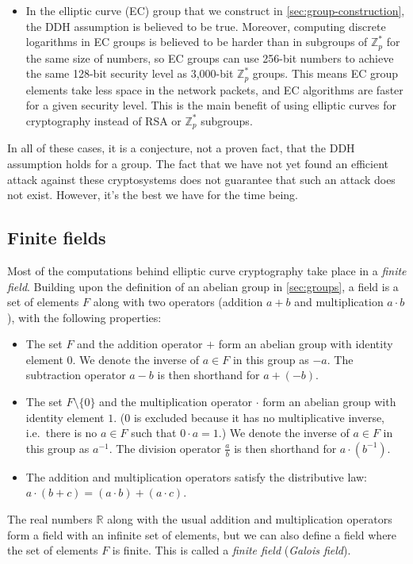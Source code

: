 \documentclass[manuscript]{acmart}
\begin{document}
\begin{itemize}
\item In the elliptic curve (EC) group that we construct in \autoref{sec:group-construction}, the DDH assumption is believed to be true.
    Moreover, computing discrete logarithms in EC groups is believed to be harder than in subgroups of $\mathbb{Z}_p^*$ for the same size of numbers, so EC groups can use 256-bit numbers to achieve the same 128-bit security level as 3,000-bit $\mathbb{Z}_p^*$ groups.
    This means EC group elements take less space in the network packets, and EC algorithms are faster for a given security level.
    This is the main benefit of using elliptic curves for cryptography instead of RSA or $\mathbb{Z}_p^*$ subgroups.
\end{itemize}

In all of these cases, it is a conjecture, not a proven fact, that the DDH assumption holds for a group.
The fact that we have not yet found an efficient attack against these cryptosystems does not guarantee that such an attack does not exist.
However, it's the best we have for the time being.


\subsection{Finite fields}\label{sec:fields}

Most of the computations behind elliptic curve cryptography take place in a \emph{finite field}.
Building upon the definition of an abelian group in \autoref{sec:groups}, a field is a set of elements $F$ along with two operators (addition $a + b$ and multiplication $a \cdot b$), with the following properties:
\begin{itemize}
    \item The set $F$ and the addition operator $+$ form an abelian group with identity element $0$.
        We denote the inverse of $a \in F$ in this group as $-a$.
        The subtraction operator $a - b$ is then shorthand for $a + (-b)$.
    \item The set $F \setminus \{0\}$ and the multiplication operator $\cdot$ form an abelian group with identity element $1$.
        (0 is excluded because it has no multiplicative inverse, i.e.\ there is no $a \in F$ such that $0 \cdot a = 1$.)
        We denote the inverse of $a \in F$ in this group as $a^{-1}$.
        The division operator $\frac{a}{b}$ is then shorthand for $a \cdot (b^{-1})$.
    \item The addition and multiplication operators satisfy the distributive law: $a \cdot (b + c) = (a \cdot b) + (a \cdot c)$.
\end{itemize}
The real numbers $\mathbb{R}$ along with the usual addition and multiplication operators form a field with an infinite set of elements, but we can also define a field where the set of elements $F$ is finite.
This is called a \emph{finite field} (\emph{Galois field}).
\end{document}
